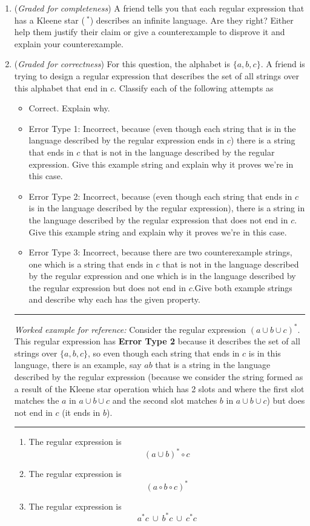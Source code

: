 \documentclass[12pt, oneside]{article}
\newcommand{\gradeCorrect}{({\it Graded for correctness}) }
\newcommand{\gradeComplete}{({\it Graded for completeness}) }
\begin{document}
\begin{enumerate}[wide, labelwidth=!, labelindent=0pt]
\begin{enumerate}
    \item\gradeComplete  A friend tells you that each regular expression that has a Kleene star ($~^*$) describes an
    infinite language. Are they right? Either help them justify their claim or give a counterexample to disprove it
    and explain your counterexample.

    \item\gradeCorrect For this question, the alphabet is $\{a,b,c\}$. A friend is trying to design a regular expression that describes the set of all strings over this alphabet that end in $c$. Classify each of the following attempts as 
    \begin{itemize}
    \item Correct. Explain why.
    \item Error Type 1: Incorrect, because (even though each string that is in the language described by the regular expression ends in $c$) there is a string that ends in $c$ that is not in the language described by the regular expression. Give this example string and explain why it proves we're in this case. 
    \item Error Type 2: Incorrect, because (even though each string that ends in $c$ is in the language described by the regular expression), there is a string in the language described by the regular expression that does not end in $c$. Give this example string and explain why it proves we're in this case. 
    \item Error Type 3: Incorrect, because there are two counterexample strings, one which is a string that ends in $c$ that is not in the language described by the regular expression and one which is in the language described by the regular expression but does not end in $c$.Give both example strings and describe why each has the given property.
    \end{itemize}

    \vfill
    \newpage

    \hrule
    {\it Worked example for reference:} Consider the regular expression $(a\cup b\cup c)^*$. This regular expression has {\bf Error Type 2} because it describes the set of all strings over $\{a,b,c\}$, so even though each string that ends in $c$ is in this language, there is an example, say $ab$ that is a string in the language described by the regular expression (because we consider the string formed as a result of the Kleene star operation which has 2 slots and where the first slot matches the $a$ in $a \cup b \cup c$ and the second slot matches $b$ in $a \cup b \cup c$) but does not end in $c$ (it ends in $b$).
    \hrule
    \begin{enumerate}
        \item The regular expression is   
        \[
        (a\cup b)^* \circ c
        \]
        \item The regular expression is  
        \[
        (a \circ b \circ c)^*
        \]
        \item The regular expression is  
        \[
        a^*c ~\cup~ b^*c ~\cup~ c^*c
        \]
    \end{enumerate}
    \end{enumerate}


\end{enumerate}
\end{document}
